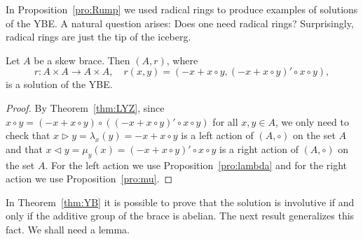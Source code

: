 

In Proposition~\ref{pro:Rump} we used radical rings to produce examples of solutions of the YBE. 
A natural question arises: Does one need radical rings? Surprisingly, 
radical rings are just the tip of the iceberg. 

\begin{theorem}
\label{thm:YB}
Let $A$ be a skew brace. Then 
$(A,r)$, where 
\[
r\colon A\times A\to A\times A,\quad
r(x,y)=( -x+x\circ y,(-x+x\circ y)'\circ x\circ y),
\]
is a solution of the YBE. 
\end{theorem}

\begin{proof}
    By Theorem~\ref{thm:LYZ}, 
    since $x\circ y=(-x+x\circ y)\circ ((-x+x\circ y)'\circ x\circ y)$ for all $x,y\in A$, 
    we only need to check that 
    $x\rhd y=\lambda_x(y)=-x+x\circ y$ 
    is a left action of $(A,\circ)$ on the set $A$ 
    and that $x\lhd y=\mu_y(x)=(-x+x\circ y)'\circ x\circ y$ 
    is a right action of $(A,\circ)$ on the set $A$. For the left action we use 
    Proposition~\ref{pro:lambda} and for the right action we use Proposition~\ref{pro:mu}.
\end{proof}

In Theorem~\ref{thm:YB} it is possible to prove that the solution 
is involutive if and only if the additive group of the brace is abelian. 
The next result generalizes this fact. We shall need a lemma.




